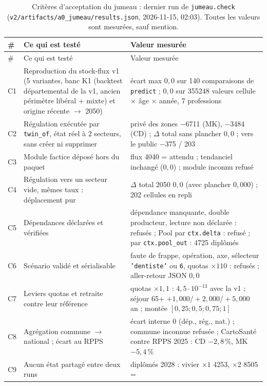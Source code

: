 {\small
\begin{longtable}{@{}lp{5.2cm}p{8.0cm}@{}}
\caption{Critères d'acceptation du jumeau : dernier run de \texttt{jumeau.check}
(\texttt{v2/artifacts/a0\_jumeau/results.json}, 2026-11-15, 02:03). Toutes les valeurs sont
mesurées\mesure{}, sauf mention.}\label{jum:tab:criteres}\\
\toprule
\# & Ce qui est testé & Valeur mesurée \\
\midrule
\endfirsthead
\toprule
\# & Ce qui est testé & Valeur mesurée \\
\midrule
\endhead
\bottomrule
\endfoot
C1 & Reproduction du stock-flux v1 (5 variantes, banc K1 (backtest départemental de la v1, ancien périmètre libéral + mixte) et origine récente $\to$ 2050) &
  écart max $0{,}0$ sur 140 comparaisons de \texttt{predict} ; $0{,}0$ sur \num{355248} valeurs
  cellule $\times$ âge $\times$ année, 7 professions \\
C2 & Régulation exécutée par \texttt{twin\_of}, état réel à 2 secteurs, sans créer ni supprimer &
  privé des zones \num{-6711} (MK), \num{-3484} (CD) ; $\Delta$ total sans plancher $0{,}0$ ; vers le
  public \num{-375} / \num{+203} \\
C3 & Module factice déposé hors du paquet & flux \num{4040} = attendu ; tendanciel inchangé ($0{,}0$) ; module
  inconnu refusé \\
C4 & Régulation vers un secteur vide, mêmes taux : déplacement pur & $\Delta$ total 2050 $0{,}0$ (avec plancher
  $0{,}000$) ; 202 cellules en repli \\
C5 & Dépendances déclarées et vérifiées & dépendance manquante, double producteur, lecture non déclarée :
  refusés ; Pool par \texttt{ctx.delta} : refusé ; par \texttt{ctx.pool\_out} : \num{4725} diplômés \\
C6 & Scénario validé et sérialisable & faute de frappe, opération, axe, sélecteur \texttt{'dentiste'} ou
  \texttt{6}, quotas $\times 110$ : refusés ; aller-retour JSON $0{,}0$ \\
C7 & Leviers quotas et retraite contre leur référence & quotas $\times 1{,}1$ : $4{,}5\cdot10^{-13}$ avec la v1 ;
  séjour 65+ $+1{,}000 / +2{,}000 / +5{,}000$ an ; montée $[0{,}25 ; 0{,}5 ; 0{,}75 ; 1]$ \\
C8 & Agrégation commune $\to$ national ; écart au RPPS & écart interne 0 (dép., rég., nat.) ; commune inconnue
  refusée ; CartoSanté contre RPPS 2025 : CD $-2{,}8$\,\%, MK $-5{,}4$\,\% \\
C9 & Aucun état partagé entre deux runs & diplômés 2028 : vivier $\times 1$ \num{4253}, $\times 2$ \num{8505} =

\end{longtable}}
